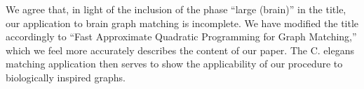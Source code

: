 \documentclass[10pt]{article}
\begin{document}
\begin{enumerate}
\begin{quote}
    \end{quote}
    We agree that, in light of the inclusion of the phase ``large (brain)'' in the title, our application to brain graph matching is incomplete.  We have modified the title accordingly to ``Fast Approximate Quadratic Programming for Graph Matching,'' which we feel more accurately describes the content of our paper.  The C. elegans matching application then serves to show the applicability of our procedure to biologically inspired graphs.
\end{enumerate}
\end{document}
